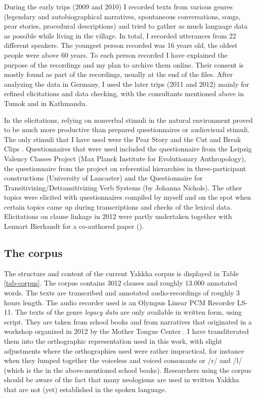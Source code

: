  
During the early trips (2009 and 2010) I recorded texts from various genres (legendary and autobiographical narratives, spontaneous conversations, songs, pear stories, procedural descriptions) and tried to gather as much language data as possible while living in the village. In total, I recorded utterances from 22 different speakers. The youngest person recorded was 16 years old, the oldest people were above 60 years. To each person recorded I have explained the purpose of the recordings and my plan to archive them online. Their consent is mostly found as part of the recordings, usually at the end of the files.  After analyzing the data in Germany, I used the later trips (2011 and 2012) mainly for refined elicitations and data checking, with the consultants mentioned above in Tumok and in Kathmandu. 

In the elicitations, relying on nonverbal stimuli in the natural environment proved to be much more productive than prepared questionnaires or audiovisual stimuli. The only stimuli that I have used were the Pear Story \citep{Chafe1980The-Pear} and the Cut and Break Clips \citep{Bohnemeyeretal2010_cut}. Questionnaires that were used included the questionnaire from the Leipzig Valency Classes Project (Max Planck Institute for Evolutionary Anthropology), the questionnaire from the project on referential hierarchies in three-participant constructions (University of Lancaster) and the Questionnaire for Transitivizing/Detransitivizing Verb Systems (by Johanna Nichols). The other topics were elicited with questionnaires compiled by myself and on the spot when certain topics came up during transcriptions and checks of the lexical data. Elicitations on clause linkage in 2012 were partly undertaken together with Lennart Bierkandt for a co-authored paper (\citet{Bierkandtetal_Scope}).

\subsection{The corpus}\label{corpus}

The structure and content of the current Yakkha corpus is displayed in Table \ref{tab-corpus}. The corpus contains 3012 clauses and roughly 13.000 annotated words. The texts are transcribed and annotated audio-recordings of roughly 3 hours length. The audio recorder used is an Olympus Linear PCM Recorder LS-11. The texts of the genre \emph{legacy data} are only available in written form, using  script. They are taken from school books \citep{Jimi2009Engka-Yakkha, Jimi2010Engka-Yakkha} and from narratives that originated in a workshop organized in 2012 by the Mother Tongue Center  \citep{Jimee2012_Casuwa, Jimee2012_Owl, Linkha2012_Ashes}. I have transliterated them into the orthographic representation used in this work, with slight adjustments where the orthographies used  were rather impractical, for instance when they lumped together the voiceless and voiced consonants or /r/ and /l/ (which is the  in the above-mentioned school books). Researchers using the corpus should be aware of the fact that many neologisms are used in written Yakkha that are not (yet) established in the spoken language. 




